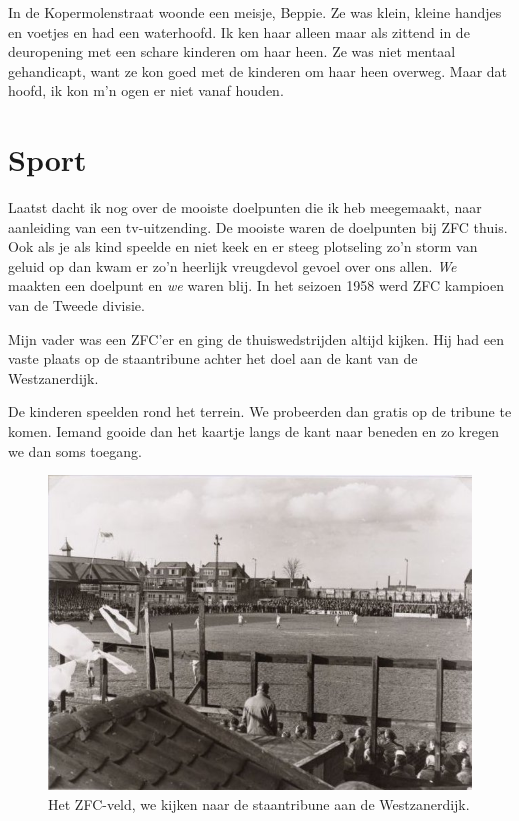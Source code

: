 \documentclass[12pt,twoside, openright]{memoir}
\begin{document}
In de Kopermolenstraat woonde een meisje, Beppie. Ze was klein, kleine handjes en voetjes en had een waterhoofd. Ik ken haar alleen maar als zittend in de deuropening met een schare kinderen om haar heen. Ze was niet mentaal gehandicapt, want ze kon goed met de kinderen om haar heen overweg. Maar dat hoofd, ik kon m’n ogen er niet vanaf houden.

\section*{Sport} %
\label{cha:sport}

Laatst dacht ik nog over de mooiste doelpunten die ik heb meegemaakt, naar aanleiding van een tv-uitzending. De mooiste waren de doelpunten bij ZFC thuis. Ook als je als kind speelde en niet keek en er steeg plotseling zo’n storm van geluid op dan kwam er zo’n heerlijk vreugdevol gevoel over ons allen. \emph{We} maakten een doelpunt en \emph{we} waren blij. In het seizoen 1958 werd ZFC kampioen van de Tweede divisie.

Mijn vader was een ZFC’er en ging de thuiswedstrijden altijd kijken. Hij had een vaste plaats op de staantribune achter het doel aan de kant van de Westzanerdijk. 

De kinderen speelden rond het terrein. We probeerden dan gratis op de tribune te komen. Iemand gooide dan het kaartje langs de kant naar beneden en zo kregen we dan soms toegang. 

\begin{figure}
\centering
\includegraphics[width=\textwidth]{img/74zfc}
\caption*{\footnotesize Het ZFC-veld, we kijken naar de staantribune aan de Westzanerdijk.}
\end{figure}
\end{document}
